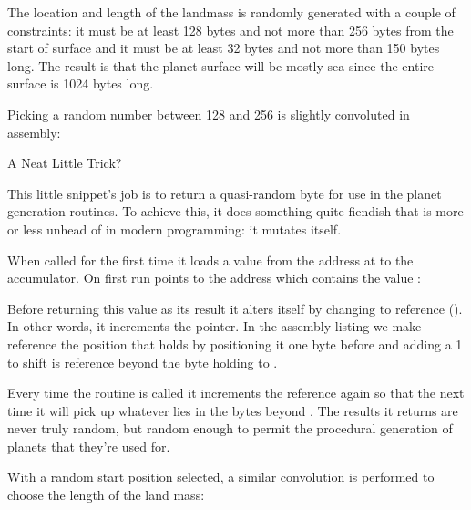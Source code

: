 The location and length of the landmass is randomly generated with a couple of constraints:
it must be at least 128 bytes  and not more than 256 bytes from the start of surface and it must be at least 32 bytes
and not more than 150 bytes long. The result is that the planet surface will be mostly sea
since the entire surface is 1024 bytes long.

Picking a random number between 128 and 256 is slightly convoluted in assembly:

%


\begin{q}
A Neat Little Trick?

%


This little snippet's job is to return a quasi-random byte for use in the planet generation
routines. To achieve this, it does something quite fiendish that is more or less unhead of in modern
programming: it mutates itself.

When called for the first time it loads a value from the address at  to the accumulator. On first
run  points to the address  which contains the value :

%


Before returning this value as its result it alters itself by changing
 to reference  (). In other words, it increments the pointer. In the
assembly listing we make  reference the position
that holds  by positioning it one byte before and
adding a 1 to shift is reference beyond the byte holding  to
.

Every time the routine is called it increments the reference again so that the next time it will pick up whatever
  lies in the bytes beyond . The results it returns are never truly random, but random enough
  to permit the procedural generation of planets that they're used for.

\end{q}

With a random start position selected, a similar convolution is performed to choose the length of the land mass:

